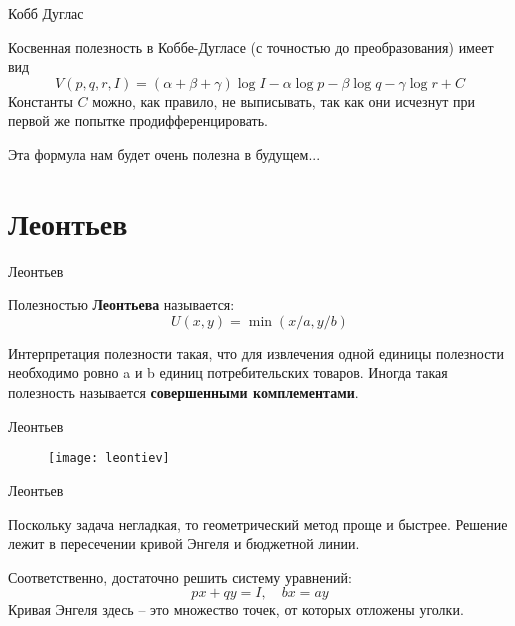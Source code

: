\documentclass{beamer}
\begin{document}
\begin{frame}{Кобб Дуглас}

Косвенная полезность в Коббе-Дугласе (с точностью до преобразования) имеет вид
$$V(p,q,r,I) = (\alpha + \beta + \gamma) \log I - \alpha \log p - \beta \log q - \gamma \log r + C $$
Константы $C$ можно, как правило, не выписывать, так как они исчезнут при первой же попытке продифференцировать.

Эта формула нам будет очень полезна в будущем...
\end{frame}

\section{Леонтьев}

\begin{frame}{Леонтьев}

\begin{definition}
Полезностью \textbf{Леонтьева} называется:
$$U(x, y) = \min(x/a, y/b)$$  
\end{definition}

Интерпретация полезности такая, что для извлечения одной единицы полезности необходимо ровно a и b единиц потребительских товаров. Иногда такая полезность называется \textbf{совершенными комплементами}.

\end{frame}

\begin{frame}{Леонтьев}

\begin{figure}[hbt]
\centering
\texttt{[image: leontiev]}
\end{figure}

\end{frame}

\begin{frame}{Леонтьев}

Поскольку задача негладкая, то геометрический метод проще и быстрее. Решение лежит в пересечении кривой Энгеля и бюджетной линии. 

Соответственно, достаточно решить систему уравнений:
$$ px + qy = I, \quad b x = a y$$
Кривая Энгеля здесь – это множество точек, от которых отложены уголки.

\end{frame}
\end{document}
